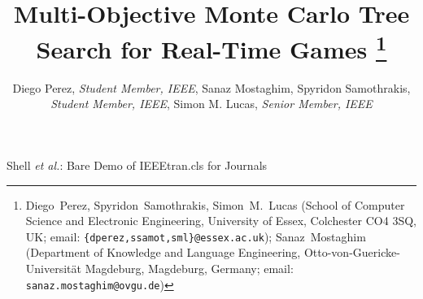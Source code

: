 \documentclass[journal]{IEEEtran}
\begin{document}
%


\title{\ \\ \LARGE\bf Multi-Objective Monte Carlo Tree Search for Real-Time Games \thanks{Diego~Perez, Spyridon~Samothrakis, Simon~M.~Lucas (School of Computer Science and Electronic Engineering, University of Essex, Colchester CO4 3SQ, UK; email: {\tt \{dperez,ssamot,sml\}@essex.ac.uk}); \newline
Sanaz~Mostaghim (Department of Knowledge and Language Engineering, Otto-von-Guericke-Universität Magdeburg, Magdeburg, Germany; email: {\tt sanaz.mostaghim@ovgu.de})}}

%
%
%

\author{Diego Perez, {\it Student Member, IEEE}, Sanaz Mostaghim, Spyridon Samothrakis, {\it Student Member, IEEE}, Simon M. Lucas, {\it Senior Member, IEEE}}

% 
%



%
{Shell \MakeLowercase{\textit{et al.}}: Bare Demo of IEEEtran.cls for Journals}
\end{document}
